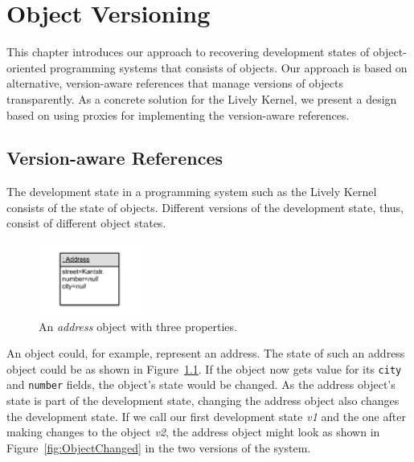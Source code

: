 



\chapter{Object Versioning} \label{chapter:APPROACH}

This chapter introduces our approach to recovering development states of object-oriented programming systems that consists of objects.
Our approach is based on alternative, version-aware references that manage versions of objects transparently.
As a concrete solution for the Lively Kernel, we present a design based on using proxies for implementing the version-aware references.


\section{Version-aware References} \label{sec:APPROACH:1}

The development state in a programming system such as the Lively Kernel consists of the state of objects.
Different versions of the development state, thus, consist of different object states. 

\begin{figure}[h]
    \centering
    \includegraphics[width=0.3\textwidth]{figures/4_approach/1_singleObject.pdf}
    \caption{An \emph{address} object with three properties.}
    \label{fig:SingleObject}
\end{figure}

An object could, for example, represent an address.
The state of such an address object could be as shown in Figure~\ref{fig:SingleObject}.
If the object now gets value for its \lstinline{city} and \lstinline{number} fields, the object's state would be changed.
As the address object's state is part of the development state, changing the address object also changes the development state.
If we call our first development state \emph{v1} and the one after making changes to the object \emph{v2}, the address object might look as shown in Figure~\ref{fig:ObjectChanged} in the two versions of the system.

